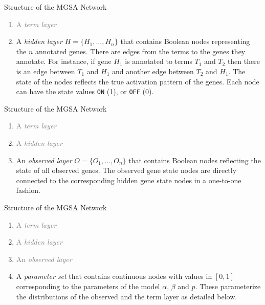 \documentclass{beamer}
\begin{document}
\begin{frame}[fragile]{Structure of the MGSA Network}

\begin{enumerate}
 \item \textcolor{gray}{A \emph{term layer}  }
 \item A \emph{hidden layer} $H=\{H_1,\ldots,H_n\}$ that contains Boolean nodes
 representing the $n$ annotated genes. There are edges
 from the terms to the genes they annotate.
 For instance, if gene $H_1$ is annotated to terms $T_1$ and $T_2$ then there is an edge between 
$T_1$ and $H_1$
 and another edge between $T_2$ and $H_1$. The state of the nodes reflects the
 true activation pattern of the genes. Each node can have the state
values \texttt{ON} (1), or \texttt{OFF} (0). 
\end{enumerate}
\end{frame}

\begin{frame}[fragile]{Structure of the MGSA Network}

\begin{enumerate}
 \item \textcolor{gray}{A \emph{term layer}  }
 \item \textcolor{gray}{A \emph{hidden layer}}
 \item An \emph{observed layer} $O=\{O_1,\ldots,O_n\}$ that contains Boolean
 nodes reflecting the state of all observed genes. The observed gene state nodes are
 directly connected to the corresponding hidden gene state nodes in a
 one-to-one fashion.
\end{enumerate}
\end{frame}
 
\begin{frame}[fragile]{Structure of the MGSA Network}

\begin{enumerate}
 \item \textcolor{gray}{A \emph{term layer}  }
 \item \textcolor{gray}{A \emph{hidden layer}}
 \item \textcolor{gray}{An \emph{observed layer} }
  \item A \emph{parameter set} that contains continuous nodes with values in
 $[0,1]$ corresponding to the parameters of the model $\alpha$, $\beta$ and
 $p$. These parameterize the distributions of the observed and the term layer
 as detailed below.
 
\end{enumerate}
\end{frame}
 
\end{document}
